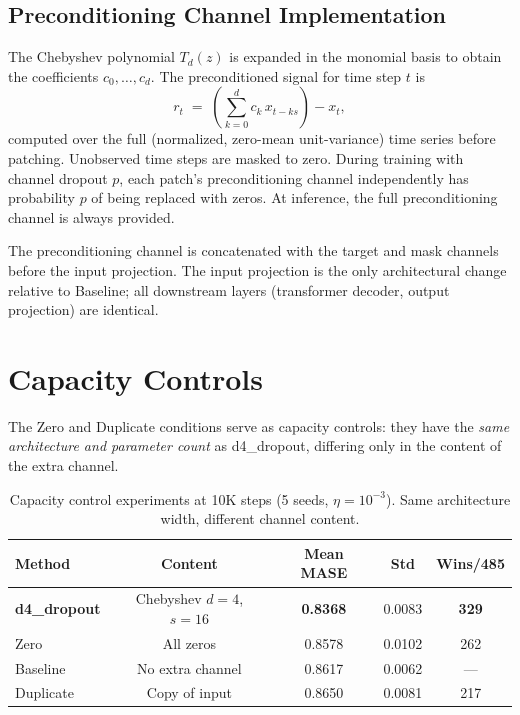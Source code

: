 \documentclass[11pt]{article}
\theoremstyle{plain}
\theoremstyle{definition}
\theoremstyle{remark}
\newcommand{\HD}{\textsf{d4\_dropout}}
\begin{document}
\subsection{Preconditioning Channel Implementation}

The Chebyshev polynomial $T_d(z)$ is expanded in the monomial basis to obtain the coefficients $c_0, \ldots, c_d$. The preconditioned signal for time step $t$ is
\[
    r_t \;=\; \left(\sum_{k=0}^{d} c_k \, x_{t-ks}\right) - x_t,
\]
computed over the full (normalized, zero-mean unit-variance) time series before patching. Unobserved time steps are masked to zero. During training with channel dropout $p$, each patch's preconditioning channel independently has probability $p$ of being replaced with zeros. At inference, the full preconditioning channel is always provided.

The preconditioning channel is concatenated with the target and mask channels before the input projection. The input projection is the only architectural change relative to Baseline; all downstream layers (transformer decoder, output projection) are identical.

\section{Capacity Controls}
\label{app:capacity}

The Zero and Duplicate conditions serve as capacity controls: they have the \emph{same architecture and parameter count} as \HD{}, differing only in the content of the extra channel.

\begin{table}[h]
\centering
\caption{Capacity control experiments at 10K steps (5 seeds, $\eta = 10^{-3}$). Same architecture width, different channel content.}
\label{tab:capacity-10k}
\small
\begin{tabular}{lcccc}
\toprule
\textbf{Method} & \textbf{Content} & \textbf{Mean MASE} & \textbf{Std} & \textbf{Wins/485} \\
\midrule
\textbf{\HD} & Chebyshev $d{=}4$, $s{=}16$ & \textbf{0.8368} & 0.0083 & \textbf{329} \\
Zero & All zeros & 0.8578 & 0.0102 & 262 \\
Baseline & No extra channel & 0.8617 & 0.0062 & --- \\
Duplicate & Copy of input & 0.8650 & 0.0081 & 217 \\
\bottomrule
\end{tabular}
\end{table}
\end{document}
